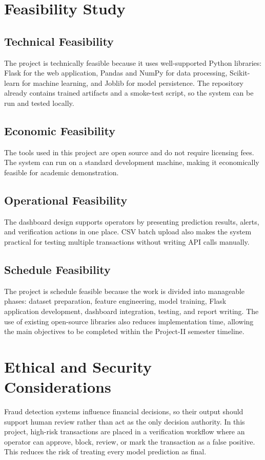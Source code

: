 \documentclass[12pt,a4paper]{report}
\begin{document}
\section{Feasibility Study}
\subsection{Technical Feasibility}
The project is technically feasible because it uses well-supported Python libraries: Flask for the web application, Pandas and NumPy for data processing, Scikit-learn for machine learning, and Joblib for model persistence. The repository already contains trained artifacts and a smoke-test script, so the system can be run and tested locally.

\subsection{Economic Feasibility}
The tools used in this project are open source and do not require licensing fees. The system can run on a standard development machine, making it economically feasible for academic demonstration.

\subsection{Operational Feasibility}
The dashboard design supports operators by presenting prediction results, alerts, and verification actions in one place. CSV batch upload also makes the system practical for testing multiple transactions without writing API calls manually.

\subsection{Schedule Feasibility}
The project is schedule feasible because the work is divided into manageable phases: dataset preparation, feature engineering, model training, Flask application development, dashboard integration, testing, and report writing. The use of existing open-source libraries also reduces implementation time, allowing the main objectives to be completed within the Project-II semester timeline.

\section{Ethical and Security Considerations}
Fraud detection systems influence financial decisions, so their output should support human review rather than act as the only decision authority. In this project, high-risk transactions are placed in a verification workflow where an operator can approve, block, review, or mark the transaction as a false positive. This reduces the risk of treating every model prediction as final.
\end{document}
